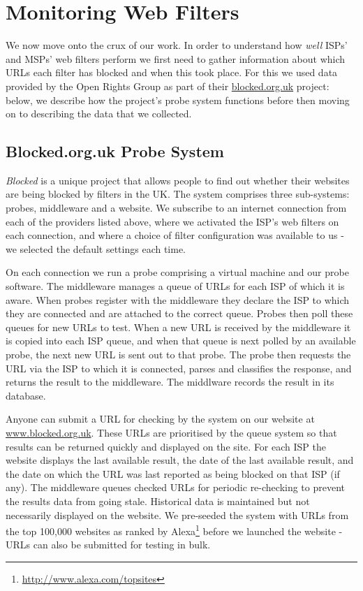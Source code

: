 \documentclass{bmcart}
\begin{document}
\section*{Monitoring Web Filters}
We now move onto the crux of our work.
In order to understand how \textit{well} ISPs' and MSPs' web filters perform we first need to gather information about which URLs each filter has blocked and when this took place.
For this we used data provided by the Open Rights Group as part of their \url{blocked.org.uk} project: below, we describe how the project's probe system functions before then moving on to describing the data that we collected.

\subsection*{Blocked.org.uk Probe System}
\emph{Blocked} is a unique project that allows people to find out whether their websites are being blocked by filters in the UK. 
The system comprises three sub-systems: probes, middleware and a website.
We subscribe to an internet connection from each of the providers listed above, where we activated the ISP's web filters on each connection, and where a choice of filter configuration was available to us - we selected the default settings each time.

On each connection we run a probe comprising a virtual machine and our probe software. 
The middleware manages a queue of URLs for each ISP of which it is aware. 
When probes register with the middleware they declare the ISP to which they are connected and are attached to the correct queue. 
Probes then poll these queues for new URLs to test.
When a new URL is received by the middleware it is copied into each ISP queue, and when that queue is next polled by an available probe, the next new URL is sent out to that probe. 
The probe then requests the URL via the ISP to which it is connected, parses and classifies the response, and returns the result to the middleware. The middlware records the result in its database.

Anyone can submit a URL for checking by the system on our website at \url{www.blocked.org.uk}. 
These URLs are prioritised by the queue system so that results can be returned quickly and displayed on the site. 
For each ISP the website displays the last available result, the date of the last available result, and the date on which the URL was last reported as being blocked on that ISP (if any).
The middleware queues checked URLs for periodic re-checking to prevent the results data from going stale. 
Historical data is maintained but not necessarily displayed on the website.
We pre-seeded the system with URLs from the top 100,000 websites as ranked by Alexa\footnote{\url{http://www.alexa.com/topsites}} before we launched the website - URLs can also be submitted for testing in bulk.
\end{document}
